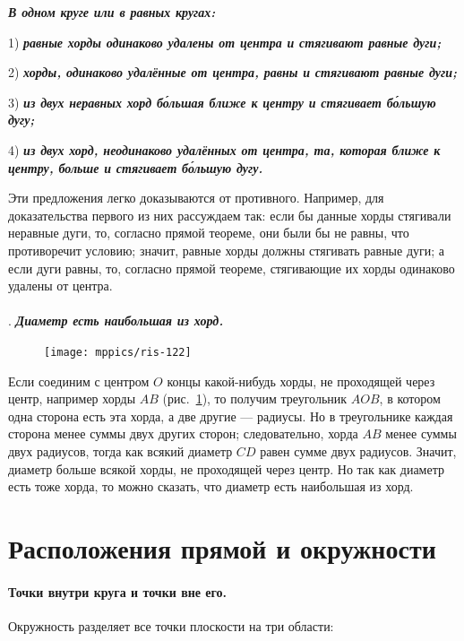 \documentclass[oneside]{book}
\begin{document}
\textbf{\emph{В одном круге или в равных кругах:}}

1) \textbf{\emph{равные хорды одинаково удалены от центра и стягивают равные дуги;}}

2) \textbf{\emph{хорды, одинаково удалённые от центра, равны и стягивают равные дуги;}}

3) \textbf{\emph{из двух неравных хорд б\'{о}льшая ближе к центру и стягивает б\'{о}льшую дугу;}}

4) \textbf{\emph{из двух хорд, неодинаково удалённых от центра, та, которая ближе к центру, больше и стягивает б\'{о}льшую дугу.}}

Эти предложения легко доказываются от противного.
Например, для доказательства первого из них рассуждаем так:
если бы данные хорды стягивали неравные дуги, то, согласно прямой теореме, они были бы не равны, что противоречит условию;
значит, равные хорды должны стягивать равные дуги;
а если дуги равны, то, согласно прямой теореме, стягивающие их хорды одинаково удалены от центра.

\paragraph{}\label{1938/111}
\mbox{.}
\textbf{\emph{Диаметр есть наибольшая из хорд.}}

\begin{figure}
\centering
\texttt{[image: mppics/ris-122]}
\caption{}\label{1938/ris-122}
\end{figure}

Если соединим с центром $O$ концы какой-нибудь хорды, не проходящей через центр, например хорды $AB$ (рис.~\ref{1938/ris-122}), то получим треугольник $AOB$, в котором одна сторона есть эта хорда, а две другие — радиусы.
Но в треугольнике каждая сторона менее суммы двух других сторон;
следовательно, хорда $AB$ менее суммы двух радиусов, тогда как всякий диаметр $CD$ равен сумме двух радиусов.
Значит, диаметр больше всякой хорды, не проходящей через центр.
Но так как диаметр есть тоже хорда, то можно сказать, что диаметр есть наибольшая из хорд.

\section{Расположения прямой и окружности}

\paragraph{Точки внутри круга и точки вне его.}\label{1914/118}
Окружность разделяет все точки плоскости на три области:
\end{document}
